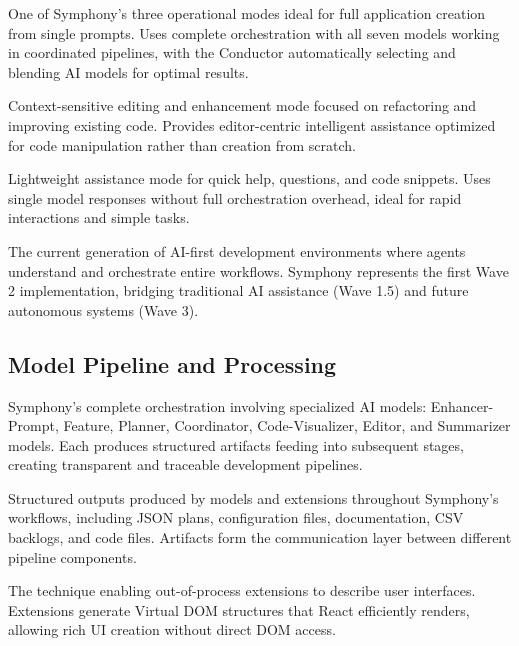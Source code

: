 \begin{description}[leftmargin=4cm,labelwidth=3.5cm]

\item[\textbf{Maestro Mode}] One of Symphony's three operational modes ideal for full application creation from single prompts. Uses complete orchestration with all seven models working in coordinated pipelines, with the Conductor automatically selecting and blending AI models for optimal results.

\item[\textbf{Virtuoso Mode}] Context-sensitive editing and enhancement mode focused on refactoring and improving existing code. Provides editor-centric intelligent assistance optimized for code manipulation rather than creation from scratch.

\item[\textbf{Solo Mode}] Lightweight assistance mode for quick help, questions, and code snippets. Uses single model responses without full orchestration overhead, ideal for rapid interactions and simple tasks.

\item[\textbf{Wave 2}] The current generation of AI-first development environments where agents understand and orchestrate entire workflows. Symphony represents the first Wave 2 implementation, bridging traditional AI assistance (Wave 1.5) and future autonomous systems (Wave 3).

\end{description}

\subsection*{Model Pipeline and Processing}

\begin{description}[leftmargin=4cm,labelwidth=3.5cm]

\item[\textbf{Seven-Model Pipeline}] Symphony's complete orchestration involving specialized AI models: Enhancer-Prompt, Feature, Planner, Coordinator, Code-Visualizer, Editor, and Summarizer models. Each produces structured artifacts feeding into subsequent stages, creating transparent and traceable development pipelines.

\item[\textbf{Artifact}] Structured outputs produced by models and extensions throughout Symphony's workflows, including JSON plans, configuration files, documentation, CSV backlogs, and code files. Artifacts form the communication layer between different pipeline components.

\item[\textbf{Virtual DOM}] The technique enabling out-of-process extensions to describe user interfaces. Extensions generate Virtual DOM structures that React efficiently renders, allowing rich UI creation without direct DOM access.

\end{description}

